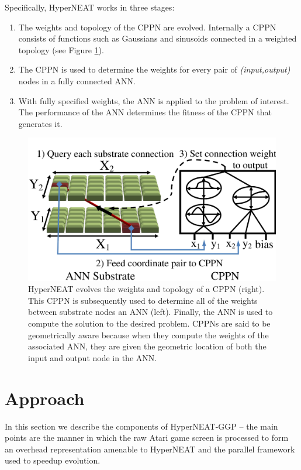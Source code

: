 \documentclass{acm_proc_article-sp}
\begin{document}
Specifically, HyperNEAT works in three stages:

\begin{enumerate}
\item The weights and topology of the CPPN are evolved. Internally a CPPN consists of functions such as Gaussians and sinusoids connected in a weighted topology (see Figure \ref{fig:cppn}).
\item The CPPN is used to determine the weights for every pair of \emph{(input,output)} nodes in a fully connected ANN.
\item With fully specified weights, the ANN is applied to the problem of interest. The performance of the ANN determines the fitness of the CPPN that generates it.
\end{enumerate}



\begin{figure}[htp]
\begin{center}
\includegraphics[width=\columnwidth]{figures/cppn}
\end{center}
\caption{HyperNEAT evolves the weights and topology of a CPPN (right). This CPPN is subsequently used to determine all of the weights between substrate nodes an ANN (left). Finally, the ANN is used to compute the solution to the desired problem. CPPNs are said to be geometrically aware because when they compute the weights of the associated ANN, they are given the geometric location of both the input and output node in the ANN.}
\label{fig:cppn}
\end{figure}

\section{Approach}
\label{sec:approach}
In this section we describe the components of HyperNEAT-GGP -- the main points are the manner in which the raw Atari game screen is processed to form an overhead representation amenable to HyperNEAT and the parallel framework used to speedup evolution.
\end{document}
